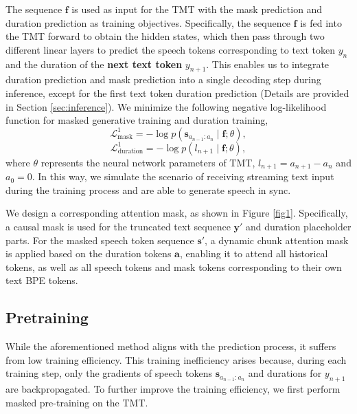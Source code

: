 The sequence $\boldsymbol{f}$ is used as input for the TMT with the mask prediction and duration prediction as training objectives. Specifically, the sequence $\boldsymbol{f}$ is fed into the TMT forward to obtain the hidden states, which then pass through two different linear layers to predict the speech tokens corresponding to text token $y_{n}$ and the duration of the \textbf{next text token} $y_{n+1}$. This enables us to integrate duration prediction and mask prediction into a single decoding step during inference, except for the first text token duration prediction (Details are provided in Section \ref{sec:inference}). 
We minimize the following negative log-likelihood function for masked generative training and duration training,
\begin{equation}
\mathcal{L}_{\text {mask}}^{1}=-\log p \left( \boldsymbol{s}_{a_{n-1}:{a_n}} \mid \boldsymbol{f}; \theta \right), 
\end{equation}
\begin{equation}
\mathcal{L}_{\text {duration}}^{1}=-\log p \left(l_{n+1}\mid \boldsymbol{f}; \theta \right),
\end{equation}
where $\theta$ represents the neural network parameters of TMT, $l_{n+1}=a_{n+1} - a_{n}$ and $a_0=0$. In this way, we simulate the scenario of receiving streaming text input during the training process and are able to generate speech in sync.


We design a corresponding attention mask, as shown in Figure \ref{fig1}. Specifically, a causal mask is used for the truncated text sequence $\boldsymbol{y}'$ and duration placeholder parts. For the  masked speech token sequence $\boldsymbol{s}'$, a dynamic chunk attention mask is applied based on the duration tokens $\boldsymbol{a}$, enabling it to attend all historical tokens, as well as all speech tokens and mask tokens corresponding to their own text BPE tokens. 

\subsection{Pretraining}
\label{sec:pretraining}
While the aforementioned method aligns with the prediction process, it suffers from low training efficiency. This training inefficiency arises because, during each training step, only the gradients of speech tokens $\boldsymbol{s}_{a_{n-1}:{a_n}}$ and durations for $y_{n+1}$ are backpropagated.
To further improve the training efficiency, we first perform masked pre-training on the TMT.


